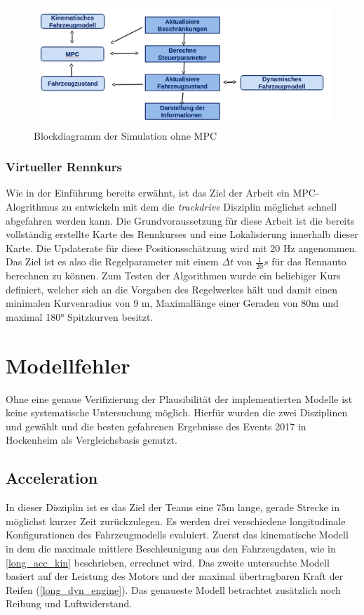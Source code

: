 \documentclass{like}
\begin{document}
\begin{figure}[ht!]
	\centering
	\includegraphics[width=350pt]{Abbildungen/sim_for_loop.png}
	\caption{Blockdiagramm der Simulation ohne MPC}
	\label{fig:block_diagram_sim}
\end{figure}


\subsection{Virtueller Rennkurs}
Wie in der Einführung bereits erwähnt, ist das Ziel der Arbeit ein \ac{MPC}-Alogrithmus zu entwickeln mit dem die \emph{trackdrive} Disziplin möglichst schnell abgefahren werden kann. Die Grundvoraussetzung für diese Arbeit ist die bereits vollständig erstellte Karte des Rennkurses und eine Lokalisierung innerhalb dieser Karte. Die Updaterate für diese Positionsschätzung wird mit 20 Hz angenommen. Das Ziel ist es also die Regelparameter mit einem $\Delta t$ von $\frac{1}{20} s$ für das Rennauto berechnen zu können.  Zum Testen der Algorithmen wurde ein beliebiger Kurs definiert, welcher sich an die Vorgaben des Regelwerkes hält und damit einen minimalen Kurvenradius von 9 m, Maximallänge einer Geraden von 80m und maximal 180° Spitzkurven besitzt.

\chapter{Modellfehler}
\label{modelError}
Ohne eine genaue Verifizierung der Plausibilität der implementierten Modelle ist keine systematische Untersuchung möglich. Hierfür wurden die zwei Disziplinen  und  gewählt und die besten gefahrenen Ergebnisse des Events 2017 in Hockenheim als Vergleichsbasis genutzt.


\section{Acceleration}
In dieser Disziplin ist es das Ziel der Teams eine 75m lange, gerade Strecke in möglichst kurzer Zeit zurückzulegen.
Es werden drei verschiedene longitudinale Konfigurationen des Fahrzeugmodells evaluiert. Zuerst das kinematische Modell in dem die maximale mittlere Beschleunigung aus den Fahrzeugdaten, wie in \ref{long_acc_kin} beschrieben, errechnet wird. Das zweite untersuchte Modell basiert auf der Leistung des Motors und der maximal übertragbaren Kraft der Reifen (\ref{long_dyn_engine}).
Das genaueste Modell betrachtet zusätzlich noch Reibung und Luftwiderstand. 
\end{document}
